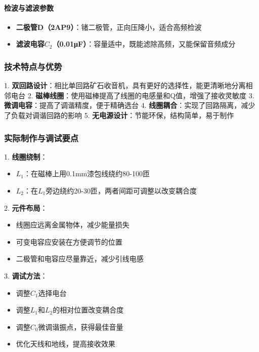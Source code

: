 \documentclass[12pt,UTF8]{ctexbook}
\begin{document}
\paragraph{检波与滤波参数}\begin{itemize}
  \item \textbf{二极管D（2AP9）}：锗二极管，正向压降小，适合高频检波
  \item \textbf{滤波电容$C_2$（0.01μF）}：容量适中，既能滤除高频，又能保留音频成分\end{itemize}

\subsubsection{技术特点与优势}

1. \textbf{双回路设计}：相比单回路矿石收音机，具有更好的选择性，能更清晰地分离相邻电台
2. \textbf{磁棒线圈}：使用磁棒提高了线圈的电感量和Q值，增强了接收灵敏度
3. \textbf{微调电容}：提高了调谐精度，便于精确选台
4. \textbf{线圈耦合}：实现了回路隔离，减少了负载对调谐回路的影响
5. \textbf{无电源设计}：节能环保，结构简单，易于制作

\subsubsection{实际制作与调试要点}

1. \textbf{线圈绕制}：\begin{itemize}
  \item $L_1$：在磁棒上用0.1mm漆包线绕约80-100匝
  \item $L_2$：在$L_1$旁边绕约20-30匝，两者间距可调整以改变耦合度\end{itemize}

2. \textbf{元件布局}：\begin{itemize}
  \item 线圈应远离金属物体，减少能量损失
  \item 可变电容应安装在方便调节的位置
  \item 二极管和电容应尽量靠近，减少引线电感\end{itemize}

3. \textbf{调试方法}：\begin{itemize}
  \item 调整$C_1$选择电台
  \item 调整$L_1$和$L_2$的相对位置改变耦合度
  \item 调整$C_0$微调谐振点，获得最佳音量
  \item 优化天线和地线，提高接收效果\end{itemize}
\end{document}
